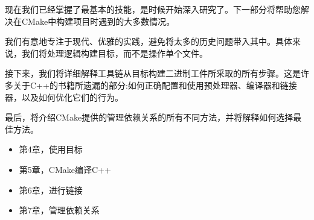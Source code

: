 现在我们已经掌握了最基本的技能，是时候开始深入研究了。下一部分将帮助您解决在CMake中构建项目时遇到的大多数情况。

我们有意地专注于现代、优雅的实践，避免将太多的历史问题带入其中。具体来说，我们将处理逻辑构建目标，而不是操作单个文件。

接下来，我们将详细解释工具链从目标构建二进制工件所采取的所有步骤。这是许多关于C++的书籍所遗漏的部分:如何正确配置和使用预处理器、编译器和链接器，以及如何优化它们的行为。

最后，将介绍CMake提供的管理依赖关系的所有不同方法，并将解释如何选择最佳方法。

\begin{itemize}
\item 第4章，使用目标
\item 第5章，CMake编译C++
\item 第6章，进行链接
\item 第7章，管理依赖关系
\end{itemize}
